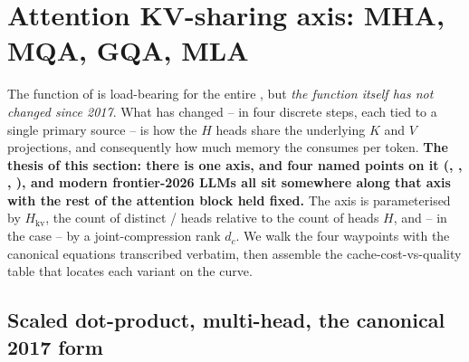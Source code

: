 
\section{Attention KV-sharing axis: MHA, MQA, GQA, MLA}
\label{sec:attention-kv-sharing}
\label{sec:kv}
\label{sec:kv-sharing}
\label{sec:attention-mechanism-axis}

The  function of \citet{vaswani2017} is
load-bearing for the entire , but \emph{the function itself
has not changed since 2017}. What has changed -- in four discrete steps,
each tied to a single primary source -- is how the $H$  heads
share the underlying $K$ and $V$ projections, and consequently how
much memory the   consumes per token.
\textbf{The thesis of this section: there is one axis, and four
named points on it (, , , ), and modern frontier-2026
LLMs all sit somewhere along that axis with the rest of the
attention block held fixed.} The axis is parameterised by
$H_{\mathrm{kv}}$, the count of distinct / heads relative to
the count of  heads $H$, and -- in the  case -- by a
joint-compression rank $d_c$. We walk the four waypoints with the
canonical equations transcribed verbatim, then assemble the
cache-cost-vs-quality table that locates each variant on the curve.

\subsection{Scaled dot-product, multi-head, the canonical 2017 form}
\label{sec:attn-canonical}

